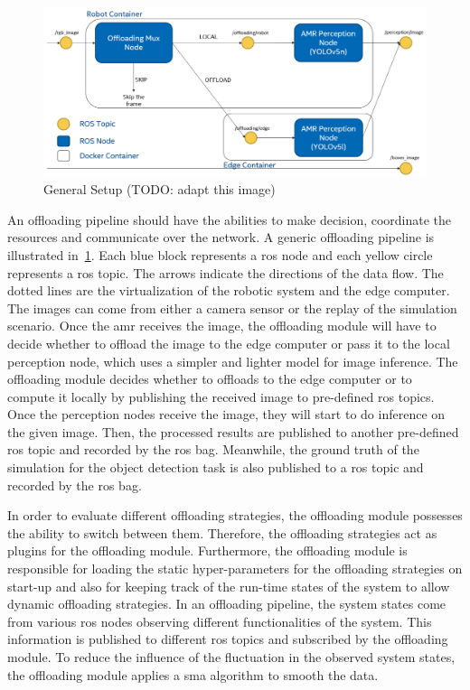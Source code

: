 \begin{figure}[htp]
    \centering
    \includegraphics[width=120mm]{figures/setup/general_setup.png}
    \caption{General Setup (TODO: adapt this image)}
    \label{fig:general_setup}
\end{figure}

An offloading pipeline should have the abilities to make decision, coordinate the resources and communicate over the network. A generic offloading pipeline is illustrated in~\cref{fig:general_setup}. Each blue block represents a \gls{ros} node and each yellow circle represents a \gls{ros} topic. The arrows indicate the directions of the data flow. The dotted lines are the virtualization of the robotic system and the edge computer. The images can come from either a camera sensor or the replay of the simulation scenario. Once the \gls{amr} receives the image, the offloading module will have to decide whether to offload the image to the edge computer or pass it to the local perception node, which uses a simpler and lighter model for image inference. The offloading module decides whether to offloads to the edge computer or to compute it locally by publishing the received image to pre-defined \gls{ros} topics. Once the perception nodes receive the image, they will start to do inference on the given image. Then, the processed results are published to another pre-defined \gls{ros} topic and recorded by the \gls{ros} bag. Meanwhile, the ground truth of the simulation for the object detection task is also published to a \gls{ros} topic and recorded by the \gls{ros} bag. 

In order to evaluate different offloading strategies, the offloading module possesses the ability to switch between them. Therefore, the offloading strategies act as plugins for the offloading module. Furthermore, the offloading module is responsible for loading the static hyper-parameters for the offloading strategies on start-up and also for keeping track of the run-time states of the system to allow dynamic offloading strategies. In an offloading pipeline, the system states come from various \gls{ros} nodes observing different functionalities of the system. This information is published to different \gls{ros} topics and subscribed by the offloading module. To reduce the influence of the fluctuation in the observed system states, the offloading module applies a \gls{sma} algorithm to smooth the data. 

